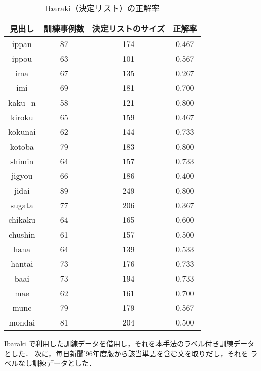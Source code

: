 \begin{table}[htbp]
  \begin{center}
    \leavevmode
    \caption{Ibaraki（決定リスト）の正解率}\label{result}
    \begin{tabular}{|c|c|c|c|} \hline
見出し & 訓練事例数      & 決定リストのサイズ & 正解率  \\ \hline
ippan     &   87     &   174    &    0.467       \\ 
ippou     &   63     &   101    &    0.567        \\ 
ima       &   67     &   135    &    0.267        \\ 
imi       &   69     &   181    &    0.700        \\ 
kaku\_n    &  58     &   121       &   0.800         \\ 
kiroku    &   65     &   159       &    0.467        \\ 
kokunai   &   62     &   144       &    0.733        \\ 
kotoba    &   79     &   183       &    0.800        \\ 
shimin    &   64     &   157       &    0.733        \\ 
jigyou    &   66     &   186       &    0.400        \\ 
jidai     &   89     &   249       &    0.800        \\ 
sugata    &   77     &   206       &    0.367        \\ 
chikaku   &   64     &   165        &    0.600        \\ 
chushin   &   61     &   157        &    0.500        \\ 
hana      &   64     &   139       &    0.533        \\ 
hantai    &   73     &   176       &    0.733        \\ 
baai      &   73     &   194       &    0.733        \\ 
mae       &   62     &   161       &    0.700        \\ 
mune      &   79     &   179       &    0.567        \\ 
mondai    &   81     &   204       &    0.500        \\  \hline
    \end{tabular}
  \end{center}
\end{table}

Ibaraki で利用した訓練データを借用し，それを本手法のラベル付き訓練データとした．
次に，毎日新聞'96年度版から該当単語を含む文を取りだし，それを
ラベルなし訓練データとした．

